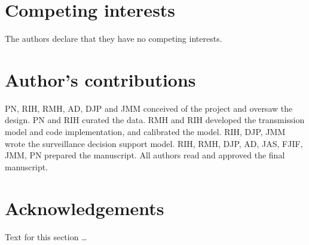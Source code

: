 \documentclass[doublespacing]{bmcart}
\begin{document}

\begin{backmatter}

\section*{Competing interests}
  The authors declare that they have no competing interests.

\section*{Author's contributions}
    PN, RIH, RMH, AD, DJP and JMM conceived of the project and oversaw the design. PN and RIH curated the data. RMH and RIH developed the transmission model and code implementation, and calibrated the model. RIH, DJP, JMM wrote the surveillance decision support model. RIH, RMH, DJP, AD, JAS, FJIF, JMM, PN prepared the manuscript. All authors read and approved the final manuscript.

\section*{Acknowledgements}
  Text for this section \ldots



\end{backmatter}
\end{document}
